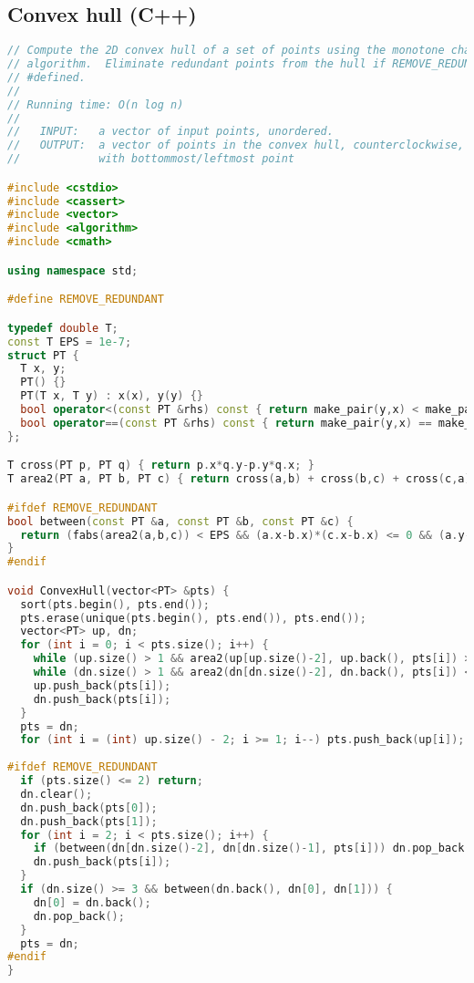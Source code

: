 \subsection{Convex hull (C++)}
\begin{lstlisting}[language=C++]
// Compute the 2D convex hull of a set of points using the monotone chain
// algorithm.  Eliminate redundant points from the hull if REMOVE_REDUNDANT is 
// #defined.
//
// Running time: O(n log n)
//
//   INPUT:   a vector of input points, unordered.
//   OUTPUT:  a vector of points in the convex hull, counterclockwise, starting
//            with bottommost/leftmost point

#include <cstdio>
#include <cassert>
#include <vector>
#include <algorithm>
#include <cmath>

using namespace std;

#define REMOVE_REDUNDANT

typedef double T;
const T EPS = 1e-7;
struct PT { 
  T x, y; 
  PT() {} 
  PT(T x, T y) : x(x), y(y) {}
  bool operator<(const PT &rhs) const { return make_pair(y,x) < make_pair(rhs.y,rhs.x); }
  bool operator==(const PT &rhs) const { return make_pair(y,x) == make_pair(rhs.y,rhs.x); }
};

T cross(PT p, PT q) { return p.x*q.y-p.y*q.x; }
T area2(PT a, PT b, PT c) { return cross(a,b) + cross(b,c) + cross(c,a); }

#ifdef REMOVE_REDUNDANT
bool between(const PT &a, const PT &b, const PT &c) {
  return (fabs(area2(a,b,c)) < EPS && (a.x-b.x)*(c.x-b.x) <= 0 && (a.y-b.y)*(c.y-b.y) <= 0);
}
#endif

void ConvexHull(vector<PT> &pts) {
  sort(pts.begin(), pts.end());
  pts.erase(unique(pts.begin(), pts.end()), pts.end());
  vector<PT> up, dn;
  for (int i = 0; i < pts.size(); i++) {
    while (up.size() > 1 && area2(up[up.size()-2], up.back(), pts[i]) >= 0) up.pop_back();
    while (dn.size() > 1 && area2(dn[dn.size()-2], dn.back(), pts[i]) <= 0) dn.pop_back();
    up.push_back(pts[i]);
    dn.push_back(pts[i]);
  }
  pts = dn;
  for (int i = (int) up.size() - 2; i >= 1; i--) pts.push_back(up[i]);
  
#ifdef REMOVE_REDUNDANT
  if (pts.size() <= 2) return;
  dn.clear();
  dn.push_back(pts[0]);
  dn.push_back(pts[1]);
  for (int i = 2; i < pts.size(); i++) {
    if (between(dn[dn.size()-2], dn[dn.size()-1], pts[i])) dn.pop_back();
    dn.push_back(pts[i]);
  }
  if (dn.size() >= 3 && between(dn.back(), dn[0], dn[1])) {
    dn[0] = dn.back();
    dn.pop_back();
  }
  pts = dn;
#endif
}

\end{lstlisting}
